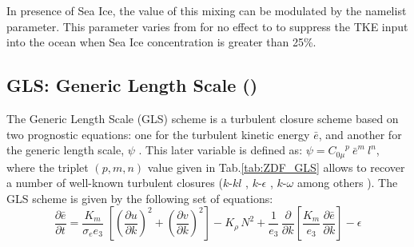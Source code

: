 \documentclass[../main/NEMO_manual]{subfiles}
\begin{document}
In presence of Sea Ice, the value of this mixing can be modulated by the  namelist parameter.
This parameter varies from  for no effect to  to suppress the TKE input into the ocean when Sea Ice concentration
is greater than 25\%.


\subsection[GLS: Generic Length Scale (\forcode{ln_zdfgls})]{GLS: Generic Length Scale (\protect{})}
\label{subsec:ZDF_gls}

\begin{listing}
  \caption{}
  \label{lst:namzdf_gls}
\end{listing}

The Generic Length Scale (GLS) scheme is a turbulent closure scheme based on two prognostic equations:
one for the turbulent kinetic energy $\bar {e}$, and another for the generic length scale,
$\psi$ \citep{umlauf.burchard_JMR03, umlauf.burchard_CSR05}.
This later variable is defined as: $\psi = {C_{0\mu}}^{p} \ {\bar{e}}^{m} \ l^{n}$,
where the triplet $(p, m, n)$ value given in Tab.\autoref{tab:ZDF_GLS} allows to recover a number of
well-known turbulent closures ($k$-$kl$ \citep{mellor.yamada_RG82}, $k$-$\epsilon$ \citep{rodi_JGR87},
$k$-$\omega$ \citep{wilcox_AJ88} among others \citep{umlauf.burchard_JMR03,kantha.carniel_JMR03}).
The GLS scheme is given by the following set of equations:
\begin{equation}
  \label{eq:ZDF_gls_e}
  \frac{\partial \bar{e}}{\partial t} =
  \frac{K_m}{\sigma_e e_3 }\;\left[ {\left( \frac{\partial u}{\partial k} \right)^2
      +\left( \frac{\partial v}{\partial k} \right)^2} \right]
  -K_\rho \,N^2
  +\frac{1}{e_3}\,\frac{\partial}{\partial k} \left[ \frac{K_m}{e_3}\,\frac{\partial \bar{e}}{\partial k} \right]
  - \epsilon
\end{equation}
\end{document}
